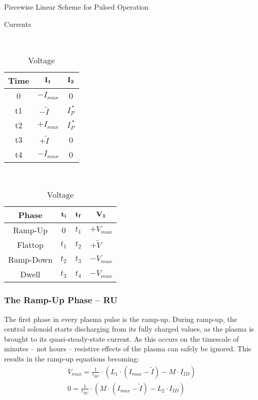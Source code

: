 \begin{table}[h!]
\centering
\caption{Piecewise Linear Scheme for Pulsed Operation}
\hfill
\begin{subtable}[t]{0.4\textwidth}
\centering
\caption{Currents} ~\\
\begin{tabular}{ c|c|c }

\textbf{Time} & {$\bold{I_1}$} & {$\bold{I_2}$} \\
\hline
0 & $-I_{max}$ & 0 \\
t1 & $-\tilde I \ \ \ \,\, $ & $I_P^{\,*} $ \\
t2 & $+I_{max}$ & $I_P^{\,*}$ \\
t3 & $+\tilde I \ \ \ \,\, $ & 0 \\
t4 & $-I_{max}$ & 0 \\
\end{tabular}
\end{subtable}
\hfill
\begin{subtable}[t]{0.5\textwidth}
\centering
\caption{Voltage} ~\\
\begin{tabular}{ c|c|c|c }
\textbf{Phase} & $\bold{t_i}$ & $\bold{t_f}$ & $\bold{V_1}$ \\
\hline
Ramp-Up & 0 & $t_1$ & $+V_{max}$ \\
Flattop & $t_1$ & $t_2$ & $+ \tilde V$ \ \,\,\, \\
Ramp-Down & $t_2$ & $t_3$ & ${-V}_{max}$ \\
Dwell & $t_3$ & $t_4$ & ${-V}_{max}$ \\
\end{tabular}
\end{subtable}
\hfill
\hfill
\end{table}


\newpage

\subsubsection{The Ramp-Up Phase -- RU}

The first phase in every plasma pulse is the ramp-up. During ramp-up, the central solenoid starts discharging from its fully charged values, as the plasma is brought to its quasi-steady-state current. As this occurs on the timescale of minutes -- not hours -- resistive effects of the plasma can safely be ignored. This results in the ramp-up equations becoming:
\begin{align}
	V_{max} = \frac{1}{\tau_{RU}} \cdot \left( L_1 \cdot ( I_{max} - \tilde I ) - M \cdot I_{ID} \right) \\
	0 = \frac{1}{\tau_{RU}} \cdot \left( M \cdot ( I_{max} - \tilde I ) - L_2 \cdot I_{ID} \right)
\end{align}

